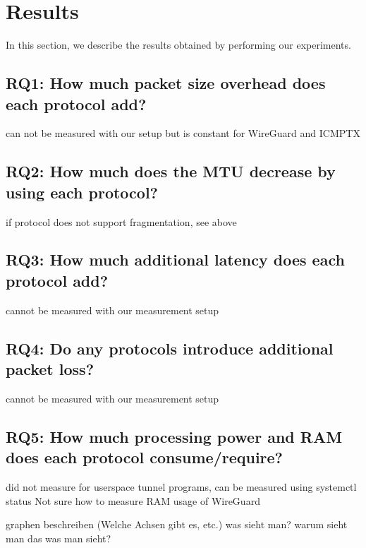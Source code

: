 
\chapter{Results}
\label{chap:results}

In this section, we describe the results obtained by performing our
experiments.

\section{RQ1: How much packet size overhead does each protocol add?}
can not be measured with our setup but is constant for WireGuard and ICMPTX

\section{RQ2: How much does the MTU decrease by using each protocol?}
if protocol does not support fragmentation, see above

\section{RQ3: How much additional latency does each protocol add?}
cannot be measured with our measurement setup

\section{RQ4: Do any protocols introduce additional packet loss?}
cannot be measured with our measurement setup

\section{RQ5: How much processing power and RAM does each protocol consume/require?}
did not measure
for userspace tunnel programs, can be measured using systemctl status
Not sure how to measure RAM usage of WireGuard


graphen beschreiben (Welche Achsen gibt es, etc.)
was sieht man?
warum sieht man das was man sieht?



